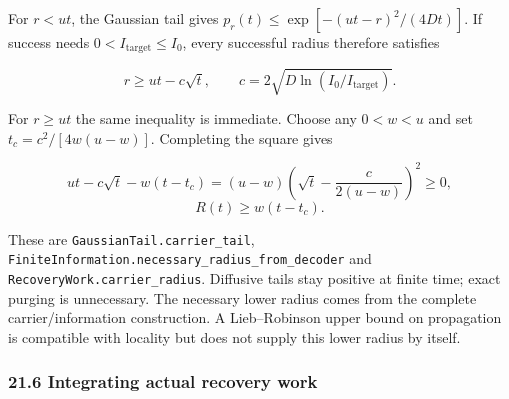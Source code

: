 \documentclass[
]{article}
\begin{document}
For \(r<ut\), the Gaussian tail gives
\(p_r(t)\le\exp[-(ut-r)^2/(4Dt)]\). If success needs
\(0<I_{\mathrm{target}}\le I_0\), every successful radius therefore
satisfies

\[
r\ge ut-c\sqrt t,\qquad
c=2\sqrt{D\ln(I_0/I_{\mathrm{target}})}.
\]

For \(r\ge ut\) the same inequality is immediate. Choose any \(0<w<u\)
and set \(t_c=c^2/[4w(u-w)]\). Completing the square gives

\[
ut-c\sqrt t-w(t-t_c)
=(u-w)\left(\sqrt t-\frac{c}{2(u-w)}\right)^2\ge0,
\] \[
\boxed{R(t)\ge w(t-t_c)}.
\]

These are
\texttt{G\allowbreak{}a\allowbreak{}u\allowbreak{}s\allowbreak{}s\allowbreak{}i\allowbreak{}a\allowbreak{}n\allowbreak{}T\allowbreak{}a\allowbreak{}i\allowbreak{}l\allowbreak{}.\allowbreak{}c\allowbreak{}a\allowbreak{}r\allowbreak{}r\allowbreak{}i\allowbreak{}e\allowbreak{}r\allowbreak{}\_\allowbreak{}t\allowbreak{}a\allowbreak{}i\allowbreak{}l},
\texttt{F\allowbreak{}i\allowbreak{}n\allowbreak{}i\allowbreak{}t\allowbreak{}e\allowbreak{}I\allowbreak{}n\allowbreak{}f\allowbreak{}o\allowbreak{}r\allowbreak{}m\allowbreak{}a\allowbreak{}t\allowbreak{}i\allowbreak{}o\allowbreak{}n\allowbreak{}.\allowbreak{}n\allowbreak{}e\allowbreak{}c\allowbreak{}e\allowbreak{}s\allowbreak{}s\allowbreak{}a\allowbreak{}r\allowbreak{}y\allowbreak{}\_\allowbreak{}r\allowbreak{}a\allowbreak{}d\allowbreak{}i\allowbreak{}u\allowbreak{}s\allowbreak{}\_\allowbreak{}f\allowbreak{}r\allowbreak{}o\allowbreak{}m\allowbreak{}\_\allowbreak{}d\allowbreak{}e\allowbreak{}c\allowbreak{}o\allowbreak{}d\allowbreak{}e\allowbreak{}r}
and
\texttt{R\allowbreak{}e\allowbreak{}c\allowbreak{}o\allowbreak{}v\allowbreak{}e\allowbreak{}r\allowbreak{}y\allowbreak{}W\allowbreak{}o\allowbreak{}r\allowbreak{}k\allowbreak{}.\allowbreak{}c\allowbreak{}a\allowbreak{}r\allowbreak{}r\allowbreak{}i\allowbreak{}e\allowbreak{}r\allowbreak{}\_\allowbreak{}r\allowbreak{}a\allowbreak{}d\allowbreak{}i\allowbreak{}u\allowbreak{}s}.
Diffusive tails stay positive at finite time; exact purging is
unnecessary. The necessary lower radius comes from the complete
c\allowbreak{}a\allowbreak{}r\allowbreak{}r\allowbreak{}i\allowbreak{}e\allowbreak{}r\allowbreak{}/\allowbreak{}i\allowbreak{}n\allowbreak{}f\allowbreak{}o\allowbreak{}r\allowbreak{}m\allowbreak{}a\allowbreak{}t\allowbreak{}i\allowbreak{}o\allowbreak{}n
construction. A Lieb--Robinson upper bound on propagation is compatible
with locality but does not supply this lower radius by itself.

\subsubsection{21.6 Integrating actual recovery
work}\label{integrating-actual-recovery-work}
\end{document}

